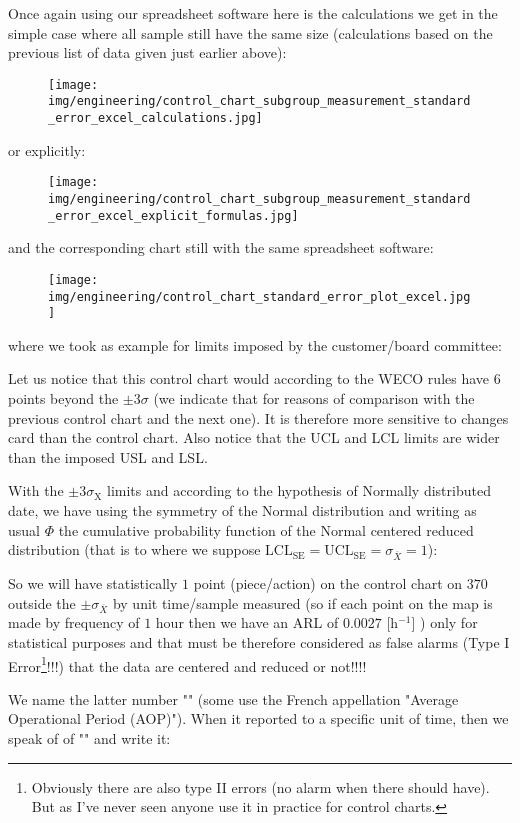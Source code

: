 	Once again using our spreadsheet software here is the calculations we get in the simple case where all sample still have the same size (calculations based on the previous list of data given just earlier above):
	\begin{figure}[H]
		\centering
		\texttt{[image: img/engineering/control\_chart\_subgroup\_measurement\_standard\_error\_excel\_calculations.jpg]}
	\end{figure}
	or explicitly:
	\begin{figure}[H]
		\centering
		\texttt{[image: img/engineering/control\_chart\_subgroup\_measurement\_standard\_error\_excel\_explicit\_formulas.jpg]}
	\end{figure}
	and the corresponding chart still with the same spreadsheet software:
	\begin{figure}[H]
		\centering
		\texttt{[image: img/engineering/control\_chart\_standard\_error\_plot\_excel.jpg]}
	\end{figure}
	where we took as example for limits imposed by the customer/board committee:
	
	Let us notice that this control chart would according to the WECO rules have $6$ points beyond the $\pm 3\sigma$ (we indicate that for reasons of comparison with the previous control chart and the next one). It is therefore more sensitive to changes card than the control chart. Also notice that the UCL and LCL limits are wider than the imposed USL and LSL.
	
	With the $\pm 3\sigma_{\text{X}}$ limits and according to the hypothesis of Normally distributed date, we have using the symmetry of the Normal distribution and writing as usual $\Phi$ the cumulative probability function of the Normal centered reduced distribution (that is to where we suppose $\text{LCL}_\text{SE}=\text{UCL}_\text{SE}=\sigma_{\overline{X}}=1$):
	
	So we will have statistically $1$ point (piece/action) on the control chart on $370$ outside the $\pm \sigma_{\overline{X}}$ by unit time/sample measured (so if each point on the map is made by frequency of $1$ hour then we have an ARL of $0.0027$ [h$^{-1}$] ) only for statistical purposes and that must be therefore considered as false alarms (Type I Error\footnote{Obviously there are also type II errors (no alarm when there should have). But as I've never seen anyone use it in practice for control charts.}!!!) that the data are centered and reduced or not!!!!
	
	We name the latter number "" (some use the French appellation "Average Operational Period (AOP)"). When it reported to a specific unit of time, then we speak of of "" and write it:
	
